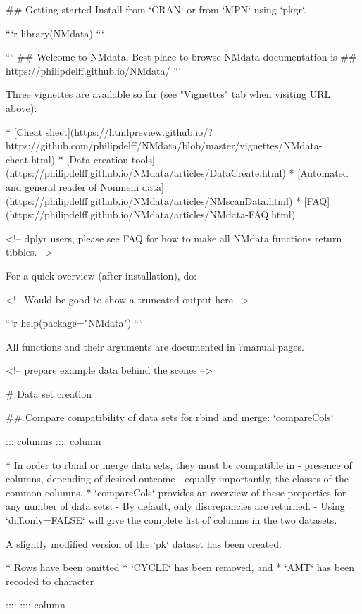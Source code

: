 ## Getting started
Install from `CRAN` or from `MPN` using `pkgr`.

```r
library(NMdata)
```

```
## Welcome to NMdata. Best place to browse NMdata documentation is
## https://philipdelff.github.io/NMdata/
```






Three vignettes are available so far (see "Vignettes" tab when visiting URL above):

* [Cheat sheet](https://htmlpreview.github.io/?https://github.com/philipdelff/NMdata/blob/master/vignettes/NMdata-cheat.html)
* [Data creation tools](https://philipdelff.github.io/NMdata/articles/DataCreate.html)
* [Automated and general reader of Nonmem data](https://philipdelff.github.io/NMdata/articles/NMscanData.html)
* [FAQ](https://philipdelff.github.io/NMdata/articles/NMdata-FAQ.html)

<!-- dplyr users, please see FAQ for how to make all NMdata functions return tibbles. -->

For a quick overview (after installation), do:

<!-- Would be good to show a truncated output here -->

```r
help(package="NMdata")
```

All functions and their arguments are documented in ?manual pages.

<!-- prepare example data behind the scenes -->


# Data set creation


## Compare compatibility of data sets for rbind and merge: `compareCols`

::: columns
:::: column

* In order to rbind or merge data sets, they must be compatible in 
- presence of columns, depending of desired outcome
- equally importantly, the classes of the common columns.
* `compareCols` provides an overview of these properties for any number of data sets. 
- By default, only discrepancies are returned. 
- Using `diff.only=FALSE` will give the complete list of columns in the two datasets.

A slightly modified version of the `pk` dataset has been created.

* Rows have been omitted
* `CYCLE` has been removed, and
* `AMT` has been recoded to character



:::: 
:::: column



